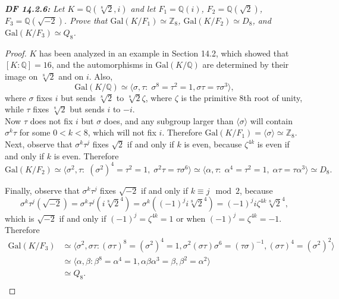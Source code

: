 \documentclass{article}
\begin{document}
\it \textbf{DF 14.2.6:} Let $K=\mathbb{Q}(\sqrt[8]{2},i)$ and let
  $F_1=\mathbb{Q}(i)$, $F_2=\mathbb{Q}(\sqrt{2})$,
  $F_3=\mathbb{Q}(\sqrt{-2})$. Prove that
  $\text{Gal}(K/F_1)\simeq\mathbb{Z}_8$, $\text{Gal}(K/F_2)\simeq D_8$, and
  $\text{Gal}(K/F_3)\simeq Q_8$.

  \begin{proof}
    $K$ has been analyzed in an example in Section 14.2, which showed that
    $[K:\mathbb{Q}]=16$, and the automorphisms in
    $\text{Gal}(K/\mathbb{Q})$ are determined by their image on
    $\sqrt[8]{2}$ and on $i$. Also, 
    \[\text{Gal}(K/\mathbb{Q}) \simeq\langle \sigma,\tau:\;
    \sigma^8=\tau^2=1, \sigma\tau=\tau\sigma^3\rangle,\]
    where $\sigma$ fixes $i$ but sends $\sqrt[8]{2}$ to $\sqrt[8]{2}\zeta$,
    where $\zeta$ is the primitive 8th root of unity, while $\tau$ fixes
    $\sqrt[8]{2}$ but sends $i$ to $-i$. \\

    Now $\tau$ does not fix $i$ but $\sigma$ does, and any subgroup larger
    than $\langle\sigma\rangle$ will contain $\sigma^k\tau$ for some
    $0<k<8$, which will not fix $i$. Therefore $\text{Gal}(K/F_1)
    =\langle\sigma\rangle \simeq\mathbb{Z}_8$. \\

    Next, observe that $\sigma^k\tau^j$ fixes $\sqrt{2}$ if and only if $k$
    is even, because $\zeta^{4k}$ is even if and only if $k$ is even.
    Therefore
    \[\text{Gal}(K/F_2) \simeq\langle \sigma^2,\tau:\;
    (\sigma^2)^4=\tau^2=1,\; \sigma^2\tau=\tau\sigma^6 \rangle \simeq
    \langle \alpha,\tau:\; \alpha^4=\tau^2=1,\;
    \alpha\tau=\tau\alpha^3\rangle \simeq D_8.\]

    Finally, observe that $\sigma^k\tau^j$ fixes $\sqrt{-2}$ if and only if
    $k\equiv j\mod2$, because
    \[\sigma^k\tau^j(\sqrt{-2}) =\sigma^k\tau^j(i\sqrt[8]{2}^4)
    =\sigma^k((-1)^ji\sqrt[8]{2}^4) =(-1)^ji\zeta^{4k}\sqrt[8]{2}^4,\]
    which is $\sqrt{-2}$ if and only if $(-1)^j=\zeta^{4k}=1$ or when
    $(-1)^j=\zeta^{4k}=-1$. Therefore
    \begin{align*}
      \text{Gal}(K/F_3) &\simeq \langle \sigma^2,\sigma\tau:
        (\sigma\tau)^8=(\sigma^2)^4=1,
        \sigma^2(\sigma\tau)\sigma^6=(\tau\sigma)^{-1},
        (\sigma\tau)^4=(\sigma^2)^2\rangle \\
      &\simeq \langle \alpha,\beta: \beta^8=\alpha^4=1,
        \alpha\beta\alpha^3=\beta, \beta^2=\alpha^2\rangle \\
      &\simeq Q_8.\\
    \end{align*}
  \end{proof}
\end{document}
